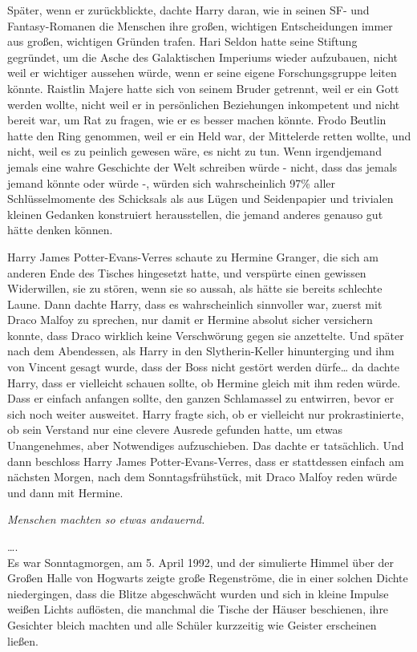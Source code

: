 {Später, wenn er zurückblickte, dachte Harry daran, wie in seinen SF- und Fantasy-Romanen die Menschen ihre großen, wichtigen Entscheidungen immer aus großen, wichtigen Gründen trafen. Hari Seldon hatte seine Stiftung gegründet, um die Asche des Galaktischen Imperiums wieder aufzubauen, nicht weil er wichtiger aussehen würde, wenn er seine eigene Forschungsgruppe leiten könnte. Raistlin Majere hatte sich von seinem Bruder getrennt, weil er ein Gott werden wollte, nicht weil er in persönlichen Beziehungen inkompetent und nicht bereit war, um Rat zu fragen, wie er es besser machen könnte. Frodo Beutlin hatte den Ring genommen, weil er ein Held war, der Mittelerde retten wollte, und nicht, weil es zu peinlich gewesen wäre, es nicht zu tun. Wenn irgendjemand jemals eine wahre Geschichte der Welt schreiben würde - nicht, dass das jemals jemand könnte oder würde -, würden sich wahrscheinlich 97\% aller Schlüsselmomente des Schicksals als aus Lügen und Seidenpapier und trivialen kleinen Gedanken konstruiert herausstellen, die jemand anderes genauso gut hätte denken können.

Harry James Potter-Evans-Verres schaute zu Hermine Granger, die sich am anderen Ende des Tisches hingesetzt hatte, und verspürte einen gewissen Widerwillen, sie zu stören, wenn sie so aussah, als hätte sie bereits schlechte Laune. Dann dachte Harry, dass es wahrscheinlich sinnvoller war, zuerst mit Draco Malfoy zu sprechen, nur damit er Hermine absolut sicher versichern konnte, dass Draco wirklich keine Verschwörung gegen sie anzettelte. Und später nach dem Abendessen, als Harry in den Slytherin-Keller hinunterging und ihm von Vincent gesagt wurde, dass der Boss nicht gestört werden dürfe… da dachte Harry, dass er vielleicht schauen sollte, ob Hermine gleich mit ihm reden würde. Dass er einfach anfangen sollte, den ganzen Schlamassel zu entwirren, bevor er sich noch weiter ausweitet. Harry fragte sich, ob er vielleicht nur prokrastinierte, ob sein Verstand nur eine clevere Ausrede gefunden hatte, um etwas Unangenehmes, aber Notwendiges aufzuschieben. Das dachte er tatsächlich. Und dann beschloss Harry James Potter-Evans-Verres, dass er stattdessen einfach am nächsten Morgen, nach dem Sonntagsfrühstück, mit Draco Malfoy reden würde und dann mit Hermine.

\emph{Menschen machten so etwas andauernd.}

….\\ Es war Sonntagmorgen, am 5. April 1992, und der simulierte Himmel über der Großen Halle von Hogwarts zeigte große Regenströme, die in einer solchen Dichte niedergingen, dass die Blitze abgeschwächt wurden und sich in kleine Impulse weißen Lichts auflösten, die manchmal die Tische der Häuser beschienen, ihre Gesichter bleich machten und alle Schüler kurzzeitig wie Geister erscheinen ließen.

}
